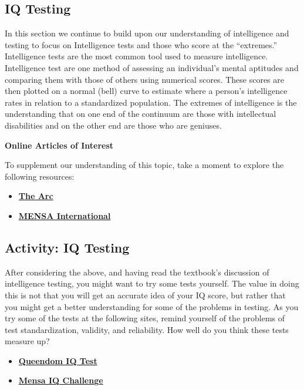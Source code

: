 \documentclass[
]{book}
\providecommand{\tightlist}{%
  \setlength{\itemsep}{0pt}\setlength{\parskip}{0pt}}
\begin{document}
\hypertarget{iq-testing}{%
\subsection*{IQ Testing}\label{iq-testing}}

In this section we continue to build upon our understanding of intelligence and testing to focus on Intelligence tests and those who score at the ``extremes.'' Intelligence tests are the most common tool used to measure intelligence. Intelligence test are one method of assessing an individual's mental aptitudes and comparing them with those of others using numerical scores. These scores are then plotted on a normal (bell) curve to estimate where a person's intelligence rates in relation to a standardized population. The extremes of intelligence is the understanding that on one end of the continuum are those with intellectual disabilities and on the other end are those who are geniuses.

\begin{caution}
\textbf{Online Articles of Interest}

To supplement our understanding of this topic, take a moment to explore the following resources:

\begin{itemize}
\item
  \href{https://thearc.org/}{\textbf{The Arc}}
\item
  \href{https://www.mensa.org}{\textbf{MENSA International}}
\end{itemize}
\end{caution}

\hypertarget{activity-iq-testing}{%
\subsection*{Activity: IQ Testing}\label{activity-iq-testing}}

\begin{reflect}
After considering the above, and having read the textbook's discussion of intelligence testing, you might want to try some tests yourself. The value in doing this is not that you will get an accurate idea of your IQ score, but rather that you might get a better understanding for some of the problems in testing. As you try some of the tests at the following sites, remind yourself of the problems of test standardization, validity, and reliability. How well do you think these tests measure up?

\begin{itemize}
\tightlist
\item
  \href{https://www.queendom.com/tests/index.htm}{\textbf{Queendom IQ Test}}
\item
  \href{https://www.mensa.org/public/mensa-iq-challenge}{\textbf{Mensa IQ Challenge}}
\end{itemize}
\end{reflect}
\end{document}
